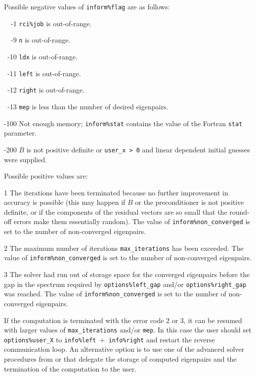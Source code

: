 \noindent
Possible negative values of {\tt inform\%flag}
are as follows:
%
\begin{description}
%
\item{~~-1}
\hskip 9pt
{\tt rci\%job}  is out-of-range.
%
\item{~~-9}
\hskip 7pt
{\tt n} is out-of-range.
%
\item{~-10}
\hskip 7pt
{\tt ldx} is out-of-range.
%
\item{~-11}
\hskip 7pt
{\tt left} is out-of-range.
%
\item{~-12}
\hskip 7pt
{\tt right} is out-of-range.
%
\item{~-13}
\hskip 7pt
{\tt mep} is less than 
the number of desired eigenpairs.
%
\item{-100}
\hskip 4pt
Not enough memory;
{\tt inform\%stat} contains the value of the Fortran {\tt stat} parameter.
%
\item{-200}
\hskip 4pt
$B$ is not positive definite or {\tt user\_x > 0} and
linear dependent initial guesses were supplied.
%
\end{description}

\noindent
Possible positive values  are: 
%
\begin{description}
\item{1}
\hskip 9pt
The iterations have been terminated because no further improvement
in accuracy is possible (this may happen if $B$ or the preconditioner is
not positive definite, or if the components of the residual vectors
are so small that the round-off
errors make them essentially random).
The value of {\tt inform\%non\_converged} is set to the number
of non-converged eigenpairs.
\item{2}
\hskip 9pt
The maximum number of iterations {\tt max\_iterations} has been exceeded.
The value of {\tt inform\%non\_converged} is set to the number
of non-converged eigenpairs.
\item{3}
\hskip 9pt
The solver had run
out of storage space for the converged eigenpairs
before the gap in the spectrum 
required by {\tt options\%left\_gap} and/or {\tt options\%right\_gap}
was reached.
The value of {\tt inform\%non\_converged} is set to the number
of non-converged eigenpairs.
%
\end{description}

If the computation is terminated with the error code 2 or 3,
it can be resumed with larger values of {\tt max\_iterations} and/or {\tt mep}.
In this case the user should set {\tt options\%user\_X} to
{\tt info\%left $+$ info\%right}
and restart the reverse communication loop.
An alternative option is to use
one of the advanced solver procedures
from {\tt \advanced} or {\tt \engine}
that delegate the storage of computed eigenpairs and
the termination of the computation to the user.

